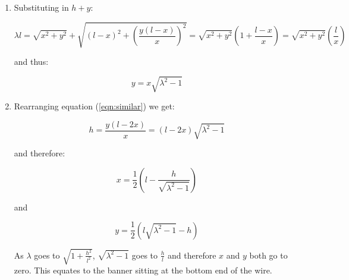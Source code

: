 \begin{problem}
{\begin{enumerate}
	Resolving forces horizontally $T \cos\alpha = T \cos\beta$ and therefore $\alpha = \beta$
	
	Thus we have two similar triangles, one with sides $x$ and $y$ and one with sides $l - x$  and  $h + y$., obeying:
	
	\begin{equation}	\frac{x}{y} = \frac{l - x}{h + y}	
	\label{eqn:similar}
	\end{equation}
	
	and we know total length of wire is $\lambda l$ therefore:
	
	\begin{equation}	\lambda l = \sqrt{x^{2} + y^{2}} + \sqrt{{(l - x)}^{2} + {(h + y)}^{2}}  \end{equation}
	
	 \item Substituting in $h + y$:
	 
	 \begin{equation*}	\lambda l = \sqrt{x^{2} + y^{2}} + \sqrt{{(l - x)}^{2} + \left({\frac{y(l-x)}{x}}\right)^{2}} 
	 = \sqrt{x^{2} + y^{2}} \left( 1 + \frac{l-x}{x} \right)
	 = \sqrt{x^{2} + y^{2}} \left(\frac{l}{x} \right)\end{equation*}
	 
	 and thus:
	 
	 \begin{equation}	y = x \sqrt{\lambda^2 - 1} 
	 \label{eqn:yx} \end{equation}
	 
	 \item Rearranging equation (\ref{eqn:similar}) we get:
	 
	  \begin{equation*}	h = \frac{y(l - 2x)}{x} =  (l - 2x)\sqrt{\lambda^2 - 1}   \end{equation*}
	  
	  and therefore:
	  
	   \begin{equation}	x = \frac{1}{2} \left(  l - \frac{h}{\sqrt{\lambda^2 -1}} \right)  \end{equation}
	   
	   and
	  
	   \begin{equation}	y = \frac{1}{2}( l\sqrt{\lambda^2 - 1} - h)  \end{equation}
	   
	   As $\lambda$ goes to $\sqrt{1 + \frac{h^2}{l^2}}$, $\sqrt{\lambda^2 -1}$ goes to $\frac{h}{l}$ and therefore $x$ and $y$ both go to zero. This equates to the banner sitting at the bottom end of the wire.
	   

\end{enumerate}}
\end{problem}
